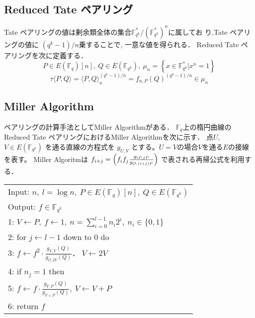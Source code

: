 \documentclass[twocolumn]{jsarticle} %
\begin{document}
\subsection{Reduced Tate ペアリング}
Tate ペアリングの値は剰余類全体の集合$\mathbb{F}_{q^k}^\ast/(\mathbb{F}_{q^k}^\ast)^n$に属してお り,Tate ペアリングの値に $(q^k - 1) / n$乗することで, 一意な値を得られる． Reduced Tate ペアリングを次に定義する．
\vspace{-2mm}
\[P \in E(\mathbb{F}_q)[n],\ Q \in E(\mathbb{F}_{q^k}),\ \mu_n = \left\{ x \in \mathbb{F}_{q^k}^\ast | x^n = 1 \right\}\]
\vspace{-4mm}
\[\tau \langle P,Q \rangle = \langle P,Q \rangle _n^{(q^k - 1) / n} = f_{n,P}(Q)^{(q^k - 1) / n} \in \mu_n\]
\par

\subsection{Miller Algorithm}
ペアリングの計算手法としてMiller Algorithmがある． $\mathbb{F}_q$上の楕円曲線のReduced Tate ペアリングにおけるMiller Algorithmを次に示す． 点$U$, $V ∈ E(\mathbb{F}_{q^k})$ を通る直線の方程式を $g_{U,V}$ とする。$U=V$の場合$V$を通る$E$の接線を表す。 Miller Algoritmは
$f_{i+j}=\Bigl(f_if_j\frac{g_{iP,jP}}{g_{\mathcal{O},(i+j)P}}\Bigr)$
で表される再帰公式を利用する．

\vspace{1zh}
\begin{longtable}
 \begin{center}
  \begin{tabular}{|l|}
     \hline
    Input: $n, \ l=\log n, \ P \in E(\mathbb{F}_q)[n], \ Q \in E(\mathbb{F}_{q^k})$ \\
    Output: $f \in \mathbb{F}_{q^k}$  \\
     \hline
    1: \quad $V \gets P, \ f \gets 1,\ n=\sum^{l-1}_{i=0} n_i 2^i, \ n_i \in \{0,1\}$\\
    2: \quad for $j \gets l-1$ down to 0 do \\
    3: \quad \quad $f \gets f^2 \cdot \frac{g_{V,V}(Q)}{g_{\mathcal{O}, 2V}(Q)}．\ V \gets 2V$\\
    4: \quad if $n_j = 1$ then\\
    5: \quad \quad $f \gets f \cdot \frac{g_{V,P}(Q)}{g_{V+P}(Q)},\ V \gets V+P$\\
    6: \quad return $f$\\
     \hline
   \end{tabular}
 \end{center}
\end{longtable}
\end{document}
